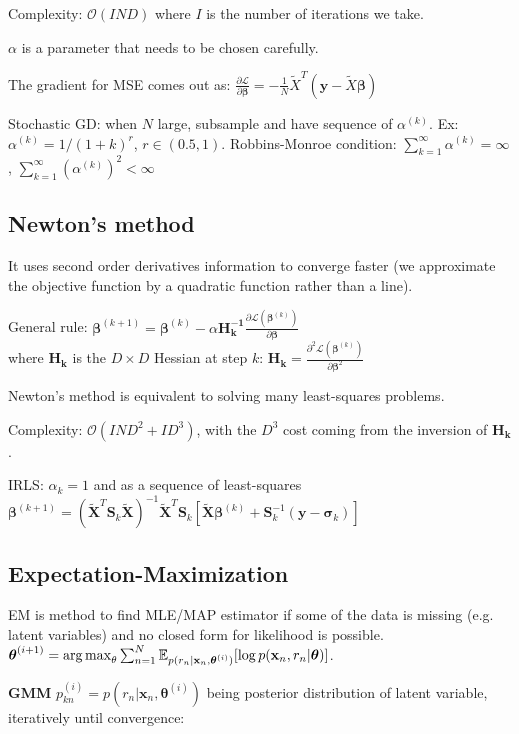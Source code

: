 \documentclass[10pt,a4paper,landscape]{article}
\renewcommand{\bf}[1]{\ensuremath{\mathbf{#1}}}
\newcommand{\bbeta}{\boldsymbol\beta}
\newcommand{\btheta}{\boldsymbol\theta}
\begin{document}
\begin{multicols*}{4}
Complexity: $\mathcal{O}(I N D)$ where $I$ is the number of iterations we take.

$\alpha$ is a parameter that needs to be chosen carefully.

The gradient for MSE comes out as:
$\frac{\partial \mathcal{L}}{\partial \bbeta} = - \frac{1}{N} \tilde{X}^T ( \boldsymbol y - \tilde{X} \bbeta )$

Stochastic GD: when $N$ large, subsample and have sequence of $\alpha^{(k)}$. Ex: $\alpha^{(k)} = 1 / (1 + k)^r$, $r \in (0.5, 1)$. Robbins-Monroe condition: $\sum_{k=1}^\infty \alpha^{(k)} = \infty$, $\sum_{k=1}^\infty (\alpha^{(k)})^2 < \infty$

\subsection{Newton's method}
It uses second order derivatives information to converge faster (we approximate the objective function by a quadratic function rather than a line).

General rule: $\bbeta^{(k+1)} = \bbeta^{(k)} - \alpha \bf{H_k^{-1}} \frac{\partial \mathcal{L}(\bbeta^{(k)})}{\partial \bbeta}$\\
where $\bf{H_k}$ is the $D \times D$ Hessian at step $k$: $\bf{H_k} = \frac{\partial^2 \mathcal{L}(\bbeta^{(k)})}{\partial \bbeta^2}$

Newton's method is equivalent to solving many least-squares problems.

Complexity: $\mathcal{O}(I N D^2 + I D^3)$, with the $D^3$ cost coming from the inversion of $\bf{H_k}$.

IRLS: $\alpha_k = 1$ and as a sequence of least-squares $\bbeta^{(k+1)} = (\tilde{\bf{X}}^T \bf{S}_k \tilde{\bf{X}})^{-1} \tilde{\bf{X}}^T \bf{S}_k 
[\tilde{\bf{X}} \bbeta^{(k)} + \bf{S}_k^{-1} (\bf{y} - \bf{\sigma}_k)]$

\subsection{Expectation-Maximization}
EM is method to find MLE/MAP estimator if some of the data is missing (e.g. latent variables) and no closed form for likelihood is possible. $\btheta^{(i+1)} = \argmax_{\theta} \sum _{n=1}^N \mathbb{E}_{p(r_n | \bf{x}_n , \btheta^{(i)})} [\log p(\bf{x}_n , r_n | \btheta)]$.

\textbf{GMM} $p_{kn}^{(i)} = p(r_n | \bf{x}_n, \btheta^{(i)})$ being posterior distribution of latent variable, iteratively until convergence:


\end{multicols*}
\end{document}
